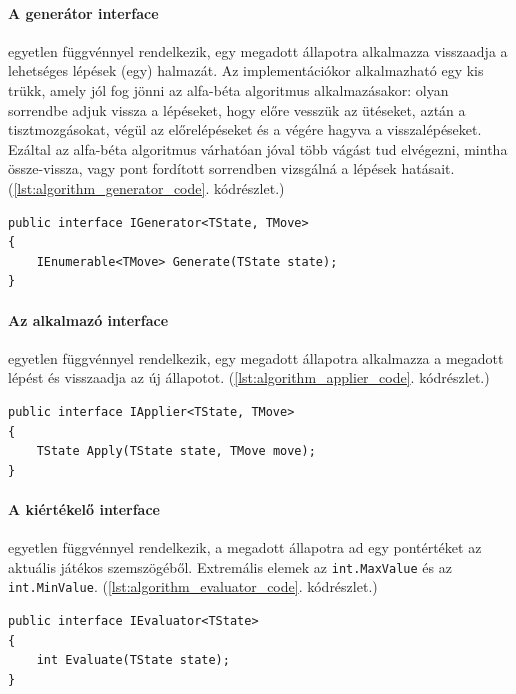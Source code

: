 \documentclass[twoside, a4paper, 12pt]{article}
\begin{document}
\paragraph{A generátor interface} egyetlen függvénnyel rendelkezik, egy megadott állapotra alkalmazza visszaadja a lehetséges lépések (egy) halmazát. Az implementációkor alkalmazható egy kis trükk, amely jól fog jönni az alfa-béta algoritmus alkalmazásakor: olyan sorrendbe adjuk vissza a lépéseket, hogy előre vesszük az ütéseket, aztán a tisztmozgásokat, végül az előrelépéseket és a végére hagyva a visszalépéseket. Ezáltal az alfa-béta algoritmus várhatóan jóval több vágást tud elvégezni, mintha össze-vissza, vagy pont fordított sorrendben vizsgálná a lépések hatásait. (\ref{lst:algorithm_generator_code}. kódrészlet.)

\begin{lstlisting}[caption=A generátor interface, label=lst:algorithm_generator_code]
public interface IGenerator<TState, TMove>
{
	IEnumerable<TMove> Generate(TState state);
}
\end{lstlisting}


\paragraph{Az alkalmazó interface} egyetlen függvénnyel rendelkezik, egy megadott állapotra alkalmazza a megadott lépést és visszaadja az új állapotot. (\ref{lst:algorithm_applier_code}. kódrészlet.)

\begin{lstlisting}[caption=Az alkalmazó interface, label=lst:algorithm_applier_code]
public interface IApplier<TState, TMove>
{
	TState Apply(TState state, TMove move);
}
\end{lstlisting}

\paragraph{A kiértékelő interface} egyetlen függvénnyel rendelkezik, a megadott állapotra ad egy pontértéket az aktuális játékos szemszögéből. Extremális elemek az \texttt{int.MaxValue} és az \texttt{int.MinValue}. (\ref{lst:algorithm_evaluator_code}. kódrészlet.)

\begin{lstlisting}[caption=A kiértékelő interface, label=lst:algorithm_evaluator_code]
public interface IEvaluator<TState>
{
	int Evaluate(TState state);
}
\end{lstlisting}
\end{document}
